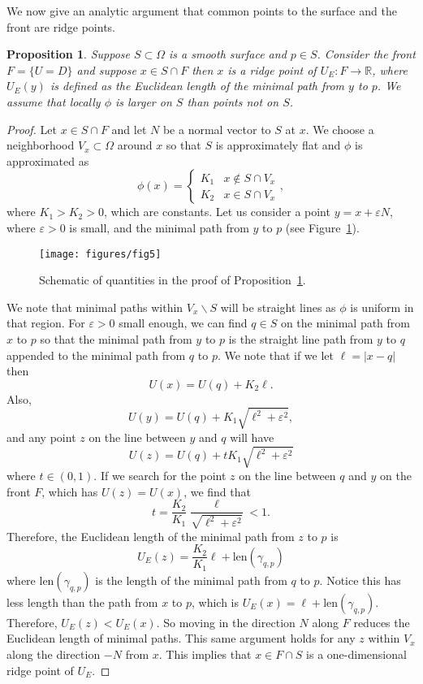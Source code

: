 \documentclass[10pt,journal,compsoc]{IEEEtran}
\newcommand{\R}{\mathbb{R}}
\newcommand{\comment}[1]{ }
\newtheorem{prop}{Proposition}
\begin{document}
We now give an analytic argument that common points to the surface and
the front are ridge points.
\begin{prop} \label{prop:ridge_surface}
  Suppose $S\subset \Omega$ is a smooth surface and $p\in S$. Consider
  the front $F = \{ U = D \}$ and suppose $x\in S \cap F$ then $x$ is
  a ridge point of $U_E : F \to \R$, where $U_E(y)$ is defined as the
  Euclidean length of the minimal path from $y$ to $p$. We assume
  that locally $\phi$ is larger on $S$ than points not on $S$.
\end{prop}
\begin{proof}
  Let $x\in S \cap F$ and let $N$ be a normal vector to $S$ at $x$. We
  choose a neighborhood $V_x \subset \Omega$ around $x$ so that $S$ is
  approximately flat and  $\phi$ is approximated as 
  \[
    \phi(x) = 
    \begin{cases}
      K_1 & x\notin S \cap V_x \\
      K_2 & x \in S \cap V_x
    \end{cases},
  \]
  where $K_1 > K_2 >0$, which are constants. Let us consider a point
  $y = x + \varepsilon N$, where $\varepsilon>0$ is small, and the
  minimal path from $y$ to $p$ (see
  Figure~\ref{fig:ridge_prf_schematic}).
  \begin{figure}
    \centering
    {\scriptsize
      \texttt{[image: figures/fig5]}
    }
    \caption{Schematic of quantities in the proof of
      Proposition~\ref{prop:ridge_surface}.}
    \label{fig:ridge_prf_schematic}
    \comment{ that points on the
      front that lie on the surface are ridge points of Euclidean path
      length}
  \end{figure}
  We note that minimal paths within $V_x \backslash S$ will be
  straight lines as $\phi$ is uniform in that region. For
  $\varepsilon>0$ small enough, we can find $q \in S$ on the minimal
  path from $x$ to $p$ so that the minimal path from $y$ to $p$ is the
  straight line path from $y$ to $q$ appended to the minimal path from
  $q$ to $p$. We note that if we let $\ell = |x-q|$ then
  \[
    U(x) = U(q) + K_2 \ell.
  \]
  Also, 
  \[
    U(y) = U(q) + K_1 \sqrt{ \ell^2 + \varepsilon^2 },
  \]
  and any point $z$ on the line between $y$ and $q$ will have 
  \[
    U(z) = U(q) + t K_1 \sqrt{ \ell^2 + \varepsilon^2 }
  \]
  where $t\in (0,1)$. If we search for the point $z$ on the line
  between $q$ and $y$ on the front $F$, which has $U(z)=U(x)$, we find
  that
  \[
    t = \frac{K_2}{K_1} \frac{ \ell }{ \sqrt{ \ell^2 + \varepsilon^2 } }
    < 1.
  \]
  Therefore, the Euclidean length of the minimal path from $z$ to $p$
  is 
  \[
    U_E(z)  = \frac{K_2}{K_1} \ell + \mbox{len}(\gamma_{q,p})
  \]
  where $\mbox{len}(\gamma_{q,p})$ is the length of the minimal path
  from $q$ to $p$. Notice this has less length than the path from $x$
  to $p$, which is $U_E(x) = \ell +
  \mbox{len}(\gamma_{q,p})$. Therefore, $U_E(z) < U_E(x)$. So moving
  in the direction $N$ along $F$ reduces the Euclidean length of
  minimal paths. This same argument holds for any $z$ within $V_x$
  along the direction $-N$ from $x$. This implies that $x\in F\cap S$
  is a one-dimensional ridge point of $U_E$.
\end{proof}
\end{document}

